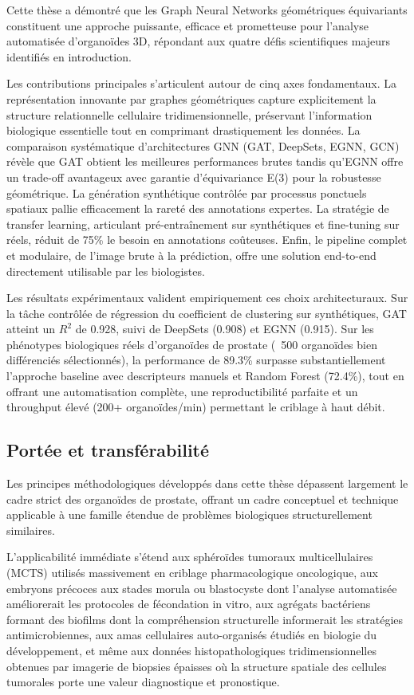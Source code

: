 Cette thèse a démontré que les Graph Neural Networks géométriques équivariants constituent une approche puissante, efficace et prometteuse pour l'analyse automatisée d'organoïdes 3D, répondant aux quatre défis scientifiques majeurs identifiés en introduction.

Les contributions principales s'articulent autour de cinq axes fondamentaux. La représentation innovante par graphes géométriques capture explicitement la structure relationnelle cellulaire tridimensionnelle, préservant l'information biologique essentielle tout en comprimant drastiquement les données. La comparaison systématique d'architectures GNN (GAT, DeepSets, EGNN, GCN) révèle que GAT obtient les meilleures performances brutes tandis qu'EGNN offre un trade-off avantageux avec garantie d'équivariance E(3) pour la robustesse géométrique. La génération synthétique contrôlée par processus ponctuels spatiaux pallie efficacement la rareté des annotations expertes. La stratégie de transfer learning, articulant pré-entraînement sur synthétiques et fine-tuning sur réels, réduit de 75\% le besoin en annotations coûteuses. Enfin, le pipeline complet et modulaire, de l'image brute à la prédiction, offre une solution end-to-end directement utilisable par les biologistes.

Les résultats expérimentaux valident empiriquement ces choix architecturaux. Sur la tâche contrôlée de régression du coefficient de clustering sur synthétiques, GAT atteint un $R^2$ de 0.928, suivi de DeepSets (0.908) et EGNN (0.915). Sur les phénotypes biologiques réels d'organoïdes de prostate (~500 organoïdes bien différenciés sélectionnés), la performance de 89.3\% surpasse substantiellement l'approche baseline avec descripteurs manuels et Random Forest (72.4\%), tout en offrant une automatisation complète, une reproductibilité parfaite et un throughput élevé (200+ organoïdes/min) permettant le criblage à haut débit.

\subsection{Portée et transférabilité}

Les principes méthodologiques développés dans cette thèse dépassent largement le cadre strict des organoïdes de prostate, offrant un cadre conceptuel et technique applicable à une famille étendue de problèmes biologiques structurellement similaires.

L'applicabilité immédiate s'étend aux sphéroïdes tumoraux multicellulaires (MCTS) utilisés massivement en criblage pharmacologique oncologique, aux embryons précoces aux stades morula ou blastocyste dont l'analyse automatisée améliorerait les protocoles de fécondation in vitro, aux agrégats bactériens formant des biofilms dont la compréhension structurelle informerait les stratégies antimicrobiennes, aux amas cellulaires auto-organisés étudiés en biologie du développement, et même aux données histopathologiques tridimensionnelles obtenues par imagerie de biopsies épaisses où la structure spatiale des cellules tumorales porte une valeur diagnostique et pronostique.

